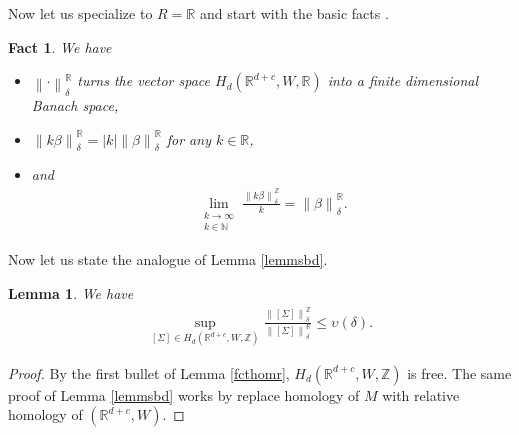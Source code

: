 \documentclass[11pt,a4paper]{amsart}
\numberwithin{equation}{section}
\newcommand{\be}{\beta}
\newcommand{\de}{\delta}
\newcommand{\Si}{\Sigma}
\newcommand{\nog}[1]{\no{#1}^{\R}}
\newcommand{\no}[1]{\left\lVert#1\right\rVert}
\newcommand{\N}{\mathbb{N}}
\newcommand{\R}{\mathbb{R}}
\newcommand{\Z}{\mathbb{Z}}
\theoremstyle{plain}
\newtheorem{lem}{Lemma}[subsection]
\newtheorem{fact}{Fact}[subsection]
\theoremstyle{definition}
\numberwithin{equation}{subsection}
\begin{document}
	Now let us specialize to $R=\R$ and start with the basic facts \cite[Section 3.9 and Section 5.8]{HFrf}.	\begin{fact}\label{fctnrtb}We have
		\begin{itemize}
					\item $\nog{\cdot}_\de$ turns the vector space $H_d(\R^{d+c},W,\R)$ into a finite dimensional Banach space, 
			\item 	$\no{k\be}^\R_\de= |k|\no{\be}^\R_\de$ for any $k\in\R$,
			\item and
			\begin{align}\label{eqfedb}
				\lim_{\substack{k\to\infty\\ k\in\N}}\frac{\no{k\be}^{\Z}_\de}{k}=\no{\be}^{\R}_\de.
			\end{align}
		\end{itemize}
	\end{fact} 
Now let us state the analogue of Lemma \ref{lemmsbd}. 
	\begin{lem}\label{lemmsbdb}
We have  \begin{align*}
		\sup_{[\Si]\in H_d(\R^{d+c},W,\Z)}		\frac{\no{[\Si]}_\de^{\Z}}{\no{[\Si]}_\de^{\R}}\le \upsilon(\de).
	\end{align*}
\end{lem}	\begin{proof}
By the first bullet of Lemma \ref{fcthomr}, $H_d(\R^{d+c},W,\Z)$ is free. The same proof of Lemma \ref{lemmsbd} works by replace homology of $M$ with relative homology of $(\R^{d+c},W)$. 	\end{proof}
\end{document}
